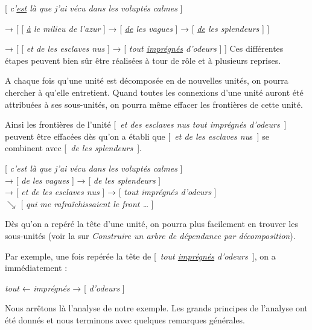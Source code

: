 \ea{}
[ \textit{c’\uline{est} là que j’ai vécu dans les voluptés calmes} ]

→ [ [ \textit{\uline{à} le milieu de l’azur} ] → [ \textit{\uline{de} les vagues} ] → [ \textit{\uline{de} les splendeurs} ] ]

→ [ [ \textit{et de les esclaves nus} ] → [ \textit{tout \uline{imprégnés} d’odeurs} ] ]
\z
Ces différentes étapes peuvent bien sûr être réalisées à tour de rôle et à plusieurs reprises.

\begin{tblsframed}{}
\noindent A chaque fois qu’une unité est décomposée en de nouvelles unités, on pourra chercher à  qu’elle entretient. Quand toutes les connexions d’une unité auront été attribuées à ses sous-unités, on pourra même effacer les frontières de cette unité.
\end{tblsframed}

Ainsi les frontières de l’unité [~\textit{et des esclaves nus tout imprégnés d’odeurs}~] peuvent être effacées dès qu’on a établi que [~\textit{et de les esclaves nu}s~] se combinent avec [~\textit{de les splendeurs}~].

\ea{} [ \textit{c’est là que j’ai vécu dans les voluptés calmes} ]\\
\glll{}  {→} {[ \textit{de les vagues} ] → [ \textit{de les splendeurs} ]}\\
            {→ [ \textit{et de les esclaves nus} ]} {→} {[ \textit{tout imprégnés d’odeurs} ]}\\
                          {}                          {$\searrow $} {[ \textit{qui me rafraîchissaient le front …} ]}\\
\z

\begin{tblsframed}{}
\noindent Dès qu’on a repéré la tête d’une unité, on pourra plus facilement en trouver les sous-unités (voir la  sur \textit{Construire un arbre de dépendance par décomposition}).
\end{tblsframed}

Par exemple, une fois repérée la tête de [~\textit{tout \uline{imprégnés} d’odeurs~}], on a immédiatement :

\ea
{\textit{tout}} ← \textit{imprégnés} → [ \textit{d’odeurs} ]
\z

Nous arrêtons là l’analyse de notre exemple. Les grands principes de l’analyse ont été donnés et nous terminons avec quelques remarques générales.

